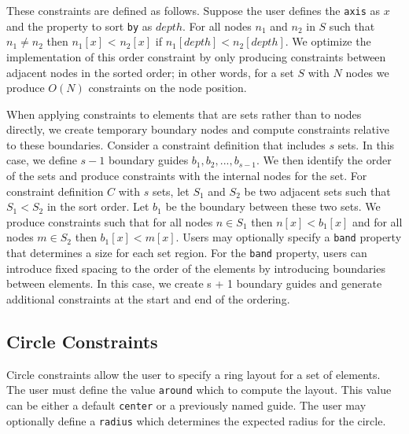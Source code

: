 These constraints are defined as follows.  Suppose the user defines the \texttt{axis} as
$x$ and the property to sort \texttt{by} as $depth$. For all nodes $n_1$ 
and $n_2$ in $S$  such that $n_1 \neq n_2$ then $n_1[x]$ < $n_2[x]$
if $n_1[depth] < n_2[depth]$. We optimize the implementation of this order
constraint by only producing constraints between adjacent nodes in the sorted 
order; in other words, for a set $S$ with $N$ nodes we produce $O(N)$ 
constraints on the node position.

When applying constraints to elements that are sets rather than to nodes
directly, we create temporary boundary nodes and compute constraints relative to
these boundaries. Consider a constraint definition that includes $s$ sets. 
In this case, we define $s-1$ boundary guides $b_1, b_2, ..., b_{s-1}$. We then
identify the order of the sets and produce constraints with the internal
nodes for the set. For constraint definition $C$ with $s$ sets, let $S_1$ and
$S_2$ be two adjacent sets such that $S_1 < S_2$ in the sort order. Let $b_1$ be
the boundary between these two sets. We produce constraints such that for all
nodes $n \in S_1$ then $n[x] < b_1[x]$ and for all nodes $m \in S_2$ then $b_1[x] < m[x]$.
Users may optionally specify a \texttt{band} property that determines a size for each
set region. For the \texttt{band} property, users can introduce fixed spacing
to the order of the elements by introducing boundaries between elements. 
In this case, we create s + 1 boundary guides and generate additional 
constraints at the start and end of the ordering.


\subsection{Circle Constraints}
Circle constraints allow the user to specify a ring layout for a set of
elements. The user must define the value \texttt{around} which to compute 
the layout. This value can be either a default \texttt{center} or a previously 
named guide. The user may optionally define a \texttt{radius} which 
determines the expected radius for the circle.


